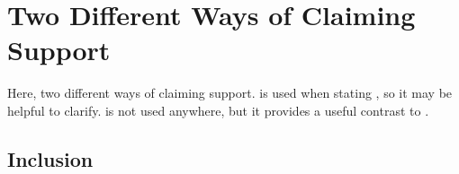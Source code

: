 \section{Two Different Ways of Claiming Support}
\label{sec:two-different-ways}

\begin{note}
  Here, two different ways of claiming support.
  \RBV{-} is used when stating \nI{}, so it may be helpful to clarify.
  \incl{} is not used anywhere, but it provides a useful contrast to \RBV{}.
\end{note}

\subsection{Inclusion}
\label{sec:inclusion-support}

